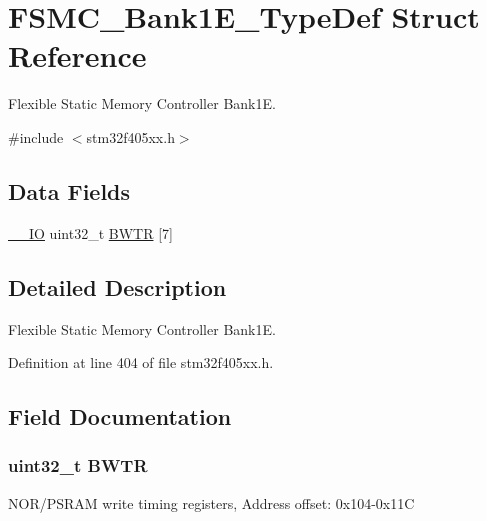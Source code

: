 \hypertarget{struct_f_s_m_c___bank1_e___type_def}{}\section{F\+S\+M\+C\+\_\+\+Bank1\+E\+\_\+\+Type\+Def Struct Reference}
\label{struct_f_s_m_c___bank1_e___type_def}


Flexible Static Memory Controller Bank1E.  




{\ttfamily \#include $<$stm32f405xx.\+h$>$}

\subsection*{Data Fields}
\begin{DoxyCompactItemize}
\item 
\hyperlink{core__sc300_8h_aec43007d9998a0a0e01faede4133d6be}{\+\_\+\+\_\+\+IO} uint32\+\_\+t \hyperlink{struct_f_s_m_c___bank1_e___type_def_a1d1738f521b04c8dee773436ae6ac4a1}{B\+W\+TR} \mbox{[}7\mbox{]}
\end{DoxyCompactItemize}


\subsection{Detailed Description}
Flexible Static Memory Controller Bank1E. 

Definition at line 404 of file stm32f405xx.\+h.



\subsection{Field Documentation}
\subsubsection[{\texorpdfstring{B\+W\+TR}{BWTR}}]{ uint32\+\_\+t B\+W\+TR}\hypertarget{struct_f_s_m_c___bank1_e___type_def_a1d1738f521b04c8dee773436ae6ac4a1}{}\label{struct_f_s_m_c___bank1_e___type_def_a1d1738f521b04c8dee773436ae6ac4a1}
N\+O\+R/\+P\+S\+R\+AM write timing registers, Address offset\+: 0x104-\/0x11C 

